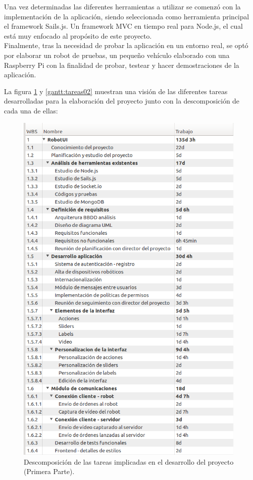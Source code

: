 Una vez determinadas las diferentes herramientas a utilizar se comenzó con la implementación de la aplicación, siendo seleccionada como herramienta principal el framework Sails.js. Un framework MVC en 
tiempo real para Node.js, el cual está muy enfocado al propósito de este proyecto.\\

Finalmente, tras la necesidad de probar la aplicación en un entorno real, se optó por elaborar un robot de pruebas, un pequeño vehículo elaborado con una Raspberry Pi con la finalidad de probar, testear y hacer 
demostraciones de la aplicación.

La figura \ref{gantt:tareas01} y \ref{gantt:tareas02} muestran una visión de las diferentes tareas desarrolladas para la elaboración del proyecto junto con la descomposición de cada una de ellas:\\

\begin{figure}
  \begin{center}
    \includegraphics[scale=0.6]{imagenes/planificacion/descomposicion_tareas01.png}
  \end{center}
  \caption{Descomposición de las tareas implicadas en el desarrollo del proyecto (Primera Parte).}
  \label{gantt:tareas01}
\end{figure}


